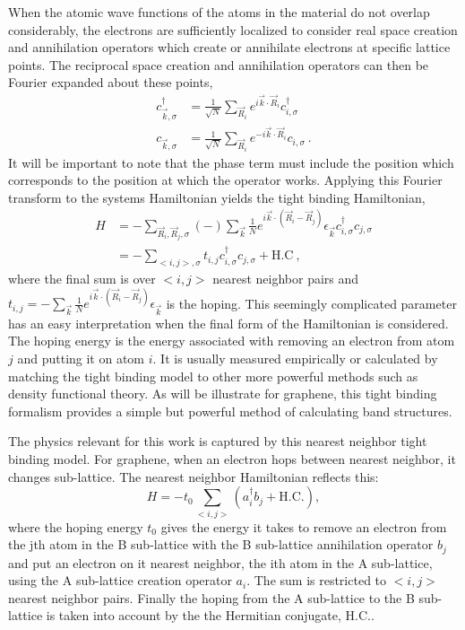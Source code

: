When the atomic wave functions of the atoms in the material do not overlap considerably, the electrons are sufficiently localized to consider real space creation and annihilation operators which create or annihilate electrons at specific lattice points.
The reciprocal space creation and annihilation operators can then be Fourier expanded about these points,
\begin{align*}
	c^{\dagger}_{\vec{k},\sigma}&=\frac{1}{\sqrt{N}}\sum_{\vec{R}_i} e^{ i \vec{k} \cdot \vec{R}_i} c^{\dagger}_{i,\sigma} \\
	c          _{\vec{k},\sigma}&=\frac{1}{\sqrt{N}}\sum_{\vec{R}_i} e^{-i \vec{k} \cdot \vec{R}_i} c_{i,\sigma} \ .
\end{align*}
It will be important to note that the phase term must include the position which corresponds to the position at which the operator works.
Applying this Fourier transform to the systems Hamiltonian yields the tight binding Hamiltonian,
\begin{align*}
	H&=-\sum_{\vec{R}_i, \vec{R}_j,\sigma} (-) \sum_{\vec{k}}\frac{1}{N} e^{i \vec{k} \cdot (\vec{R}_i-\vec{R}_j)}
	 \epsilon_{\vec{k}} c^{\dagger}_{i,\sigma} c_{j,\sigma} \\
	 &=-\sum_{<i,j>,\sigma} t_{i,j} c^{\dagger}_{i,\sigma} c_{j,\sigma} + \text{H.C} \ ,
\end{align*}
where the final sum is over $<i,j>$ nearest neighbor pairs and $t_{i,j}=-\sum_{\vec{k}}\frac{1}{N} e^{i \vec{k} \cdot (\vec{R}_i-\vec{R}_j)}\epsilon_{\vec{k}}$ is the hoping.
This seemingly complicated parameter has an easy interpretation when the final form of the Hamiltonian is considered.
The hoping energy is the energy associated with removing an electron from atom $j$ and putting it on atom $i$.
It is usually measured empirically or calculated by matching the tight binding model to other more powerful methods such as density functional theory.
As will be illustrate for graphene, this tight binding formalism provides a simple but powerful method of calculating band structures.

The physics relevant for this work is captured by this nearest neighbor tight binding model.
For graphene, when an electron hops between nearest neighbor, it changes sub-lattice.
The nearest neighbor Hamiltonian reflects this:
\begin{equation}
	H=-t_0 \sum_{<i,j>} (a_i^{\dagger} b_j + \text{H.C.}),
	\label{eq:TB:baseham}
\end{equation}
where the hoping energy $t_0$ gives the energy it takes to remove an electron from the jth atom in the B sub-lattice with the B sub-lattice annihilation operator $b_j$ and put an electron on it nearest neighbor, the ith atom in the A sub-lattice, using the A sub-lattice creation operator $a_i$.
The sum is restricted to $<i,j>$ nearest neighbor pairs.
Finally the hoping from the A sub-lattice to the B sub-lattice is taken into account by the the Hermitian conjugate, $\text{H.C.}$.

